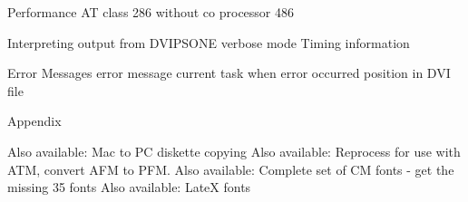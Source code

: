 Performance
	AT class 286 without co processor
	486

Interpreting output from DVIPSONE
	verbose mode
	Timing information

Error Messages
	error message
	current task when error occurred
	position in DVI file


Appendix




Also available: Mac to PC diskette copying
Also available: Reprocess for use with ATM, convert AFM to PFM.
Also available: Complete set of CM fonts - get the missing 35 fonts
Also available: LateX fonts


















